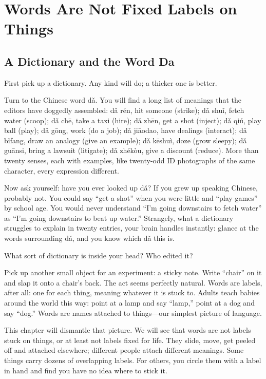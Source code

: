 \chapter{Words Are Not Fixed Labels on Things}
\section{A Dictionary and the Word Da}
First pick up a dictionary. Any kind will do; a thicker one is better.

Turn to the Chinese word dǎ. You will find a long list of meanings that the editors have doggedly assembled: dǎ rén, hit someone (strike); dǎ shuǐ, fetch water (scoop); dǎ chē, take a taxi (hire); dǎ zhēn, get a shot (inject); dǎ qiú, play ball (play); dǎ gōng, work (do a job); dǎ jiāodao, have dealings (interact); dǎ bǐfang, draw an analogy (give an example); dǎ kēshuì, doze (grow sleepy); dǎ guānsi, bring a lawsuit (litigate); dǎ zhékòu, give a discount (reduce). More than twenty senses, each with examples, like twenty-odd ID photographs of the same character, every expression different.

Now ask yourself: have you ever looked up dǎ? If you grew up speaking Chinese, probably not. You could say ``get a shot'' when you were little and ``play games'' by school age. You would never understand ``I'm going downstairs to fetch water'' as ``I'm going downstairs to beat up water.'' Strangely, what a dictionary struggles to explain in twenty entries, your brain handles instantly: glance at the words surrounding dǎ, and you know which dǎ this is.

What sort of dictionary is inside your head? Who edited it?

Pick up another small object for an experiment: a sticky note. Write ``chair'' on it and slap it onto a chair's back. The act seems perfectly natural. Words are labels, after all: one for each thing, meaning whatever it is stuck to. Adults teach babies around the world this way: point at a lamp and say ``lamp,'' point at a dog and say ``dog.'' Words are names attached to things---our simplest picture of language.

This chapter will dismantle that picture. We will see that words are not labels stuck on things, or at least not labels fixed for life. They slide, move, get peeled off and attached elsewhere; different people attach different meanings. Some things carry dozens of overlapping labels. For others, you circle them with a label in hand and find you have no idea where to stick it.

